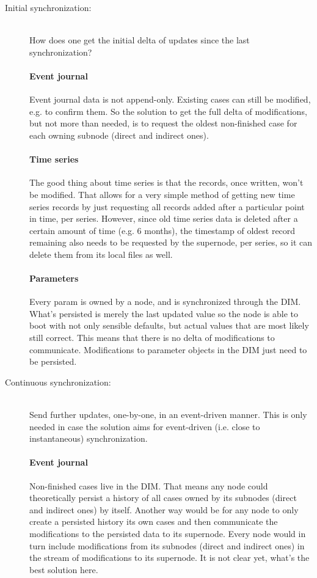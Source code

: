 \begin{description}
	\item [Initial synchronization:]\hfill\\
		How does one get the initial delta of updates since the last
		synchronization?


		\paragraph{Event journal} Event journal data is not
		append-only. Existing cases can still be modified, e.g. to
		confirm them. So the solution to get the full delta of
		modifications, but not more than needed, is to request the
		oldest non-finished case for each owning subnode (direct and
		indirect ones).

		\paragraph{Time series} The good thing about time series is
		that the records, once written, won't be modified. That allows
		for a very simple method of getting new time series records by
		just requesting all records added after a particular point in
		time, per series. However, since old time series data is
		deleted after a certain amount of time (e.g. 6 months), the
		timestamp of oldest record remaining also needs to be requested
		by the supernode, per series, so it can delete them from its
		local files as well.

		\paragraph{Parameters} Every param is owned by a node, and is
		synchronized through the DIM.  What's persisted is merely the
		last updated value so the node is able to boot with not only
		sensible defaults, but actual values that are most likely still
		correct. This means that there is no delta of modifications to
		communicate. Modifications to parameter objects in the DIM just
		need to be persisted.

	\item [Continuous synchronization:]\hfill\\
		Send further updates, one-by-one, in an event-driven manner.
		This is only needed in case the solution aims for event-driven
		(i.e. close to instantaneous) synchronization.

		\paragraph{Event journal} Non-finished cases live in the DIM.
		That means any node could theoretically persist a history of
		all cases owned by its subnodes (direct and indirect ones) by
		itself. Another way would be for any node to only create a
		persisted history its own cases and then communicate the
		modifications to the persisted data to its supernode. Every
		node would in turn include modifications from its subnodes
		(direct and indirect ones) in the stream of modifications to
		its supernode. {\color{red}It is not clear yet, what's the best
		solution here.}\\


\end{description}
